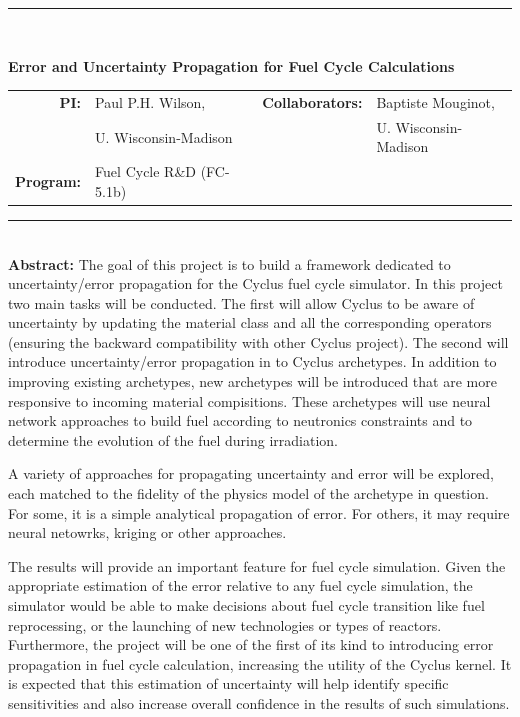 \documentclass[dvips,12pt]{article}
\begin{document}
\vspace*{0.5in}

\noindent\rule{\textwidth}{1pt}\

\vspace*{0.2in}

\begin{centering}
  \textbf{\large Error and Uncertainty Propagation for Fuel Cycle Calculations}\\
\end{centering}

\vspace*{0.25in}

\noindent
\begin{tabularx}{\textwidth}{rlrl}
   \textbf{PI:} & Paul P.H. Wilson, & 
         \textbf{Collaborators:} & Baptiste Mouginot, \\
                & U. Wisconsin-Madison & 
         & U. Wisconsin-Madison \\
   \textbf{Program:} & Fuel Cycle R\&D (FC-5.1b) & &
\end{tabularx}



\vspace{0.2in}
\noindent\rule{\textwidth}{1pt}\\

\noindent\textbf{Abstract:} The goal of this
project is to build a framework dedicated to
uncertainty/error propagation for the Cyclus fuel
cycle simulator. In this project two main tasks
will be conducted. The first will allow Cyclus to
be aware of uncertainty by updating the material
class and all the corresponding operators
(ensuring the backward compatibility with other
Cyclus project). The second will introduce
uncertainty/error propagation in to Cyclus
archetypes.  In addition to improving existing
archetypes, new archetypes will be introduced that
are more responsive to incoming material
compisitions.  These archetypes will use neural
network approaches to build fuel according to
neutronics constraints and to determine the
evolution of the fuel during irradiation.

A variety of approaches for propagating
uncertainty and error will be explored, each
matched to the fidelity of the physics model of
the archetype in question.  For some, it is a
simple analytical propagation of error.  For
others, it may require neural netowrks, kriging or
other approaches.

The results will provide an important feature for
fuel cycle simulation. Given the appropriate
estimation of the error relative to any fuel cycle
simulation, the simulator would be able to make
decisions about fuel cycle transition like fuel
reprocessing, or the launching of new technologies
or types of reactors. Furthermore, the project
will be one of the first of its kind to
introducing error propagation in fuel cycle
calculation, increasing the utility of the Cyclus
kernel.  It is expected that this estimation of
uncertainty will help identify specific
sensitivities and also increase overall confidence
in the results of such simulations.
\end{document}
